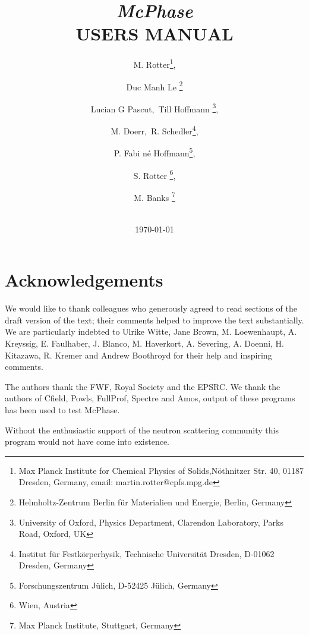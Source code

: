 \documentclass[twoside]{article}
\begin{document}
 \title{ {\Huge \bf \em McPhase} \\
 \vspace{1cm} 
{\bf   USERS MANUAL}\\
  \vspace{2cm} 
\vspace{3cm}}

\date {\vspace{2cm} 
 \vspace{2cm}
 \\ \today}

\author{M. Rotter\thanks{Max Planck Institute for Chemical Physics of Solids,N\"othnitzer Str. 40, 01187 Dresden, 
Germany, email: martin.rotter@cpfs.mpg.de}, \and
Duc Manh Le \thanks{Helmholtz-Zentrum Berlin f\"ur Materialien und Energie, Berlin, Germany}
\and Lucian G Pascut,~Till Hoffmann 
\thanks{University of Oxford, Physics Department, Clarendon Laboratory, Parks Road, Oxford, UK},
\and
 M. Doerr,~R. Schedler\thanks{Institut f\"ur Festk\"orperhysik, Technische Universit\"at Dresden, D-01062 Dresden, Germany},
\and
P. Fabi n\'e Hoffmann\thanks{Forschungszentrum J\"ulich, D-52425 J\"ulich, Germany},
\and S. Rotter \thanks{Wien, Austria},
\and M. Banks \thanks{Max Planck Institute, Stuttgart, Germany}
}


\maketitle
\clearpage

\section*{Acknowledgements}

We would like to thank colleagues who generously agreed to read sections of the draft version
of the text; their comments helped to improve the text substantially. We are particularly indebted to
Ulrike Witte, Jane Brown, M. Loewenhaupt, A. Kreyssig, E. Faulhaber,
J. Blanco, M. Haverkort, A. Severing,
A. Doenni, H. Kitazawa, R. Kremer 
 and Andrew Boothroyd for their help and inspiring comments.

The authors thank the FWF, Royal Society and the EPSRC.
We thank the authors of Cfield, Powls, FullProf, Spectre and Amos, output 
of these programs has been used to test McPhase. 

Without the enthusiastic support of the neutron scattering 
community this program would not have come into existence. 
\end{document}
